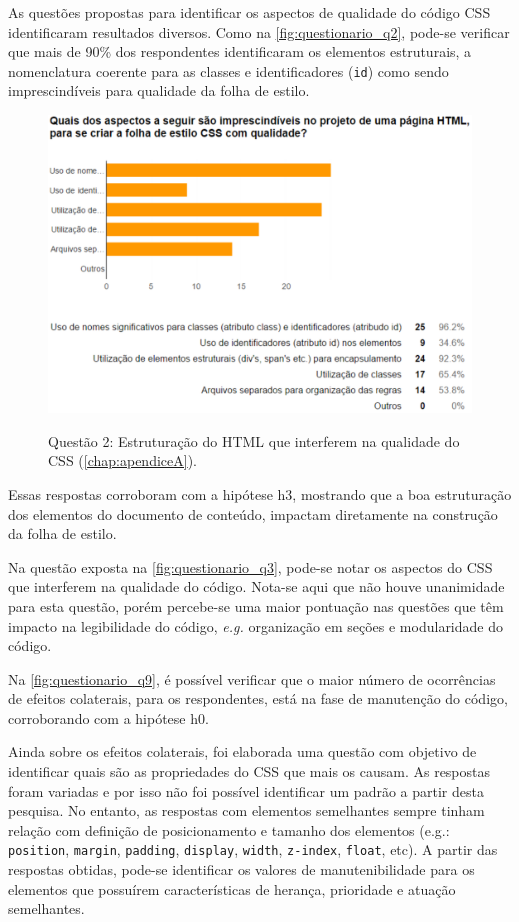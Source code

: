 As questões propostas para identificar os aspectos de qualidade do código CSS identificaram resultados diversos. Como na \autoref{fig:questionario_q2}, pode-se verificar que mais de 90\% dos respondentes identificaram os elementos estruturais, a nomenclatura coerente para as classes e identificadores (\texttt{id}) como sendo imprescindíveis para qualidade da folha de estilo.

\begin{figure}[!htb]
	\centering
	\caption{Questão 2: Estruturação do HTML que interferem na qualidade do CSS (\autoref{chap:apendiceA}).}
	\includegraphics[width=1\textwidth]{./04-figuras/questionario_q2}
	\label{fig:questionario_q2}
\end{figure}

Essas respostas corroboram com a hipótese h3, mostrando que a boa estruturação dos elementos do documento de conteúdo, impactam diretamente na construção da folha de estilo.

Na questão exposta na \autoref{fig:questionario_q3}, pode-se notar os aspectos do CSS que interferem na qualidade do código. Nota-se aqui que não houve unanimidade para esta questão, porém percebe-se uma maior pontuação nas questões que têm impacto na legibilidade do código, \textit{e.g.} organização em seções e modularidade do código.

Na \autoref{fig:questionario_q9}, é possível verificar que o maior número de ocorrências de efeitos colaterais, para os respondentes, está na fase de manutenção do código, corroborando com a hipótese h0.

Ainda sobre os efeitos colaterais, foi elaborada uma questão com objetivo de identificar quais são as propriedades do CSS que mais os causam. As respostas foram variadas e por isso não foi possível identificar um padrão a partir desta pesquisa. No entanto, as respostas com elementos semelhantes sempre tinham relação com definição de posicionamento e tamanho dos elementos (e.g.: \texttt{position}, \texttt{margin}, \texttt{padding}, \texttt{display}, \texttt{width}, \texttt{z-index}, \texttt{float}, etc). A partir das respostas obtidas, pode-se identificar os valores de manutenibilidade para os elementos que possuírem características de herança, prioridade e atuação semelhantes.

